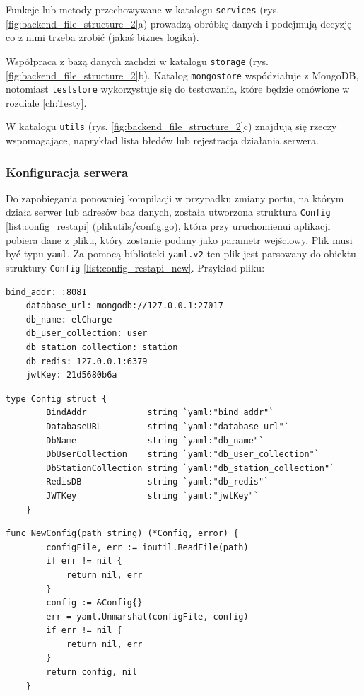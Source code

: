 Funkcje lub metody przechowywane w katalogu \texttt{services} (rys. \ref{fig:backend_file_structure_2}a) prowadzą obróbkę danych i podejmują decyzję co z nimi trzeba zrobić (jakaś biznes logika).

Współpraca z bazą danych zachdzi w katalogu \texttt{storage} (rys. \ref{fig:backend_file_structure_2}b). Katalog \texttt{mongostore} wspódziałuje z MongoDB, notomiast \texttt{teststore} wykorzystuje się do testowania, które będzie omówione w rozdiale \ref{ch:Testy}.

W katalogu \texttt{utils} (rys. \ref{fig:backend_file_structure_2}c) znajdują się rzeczy wspomagające, naprykład lista błedów lub rejestracja działania serwera.


\subsubsection{Konfiguracja serwera}
Do zapobiegania ponowniej kompilacji w przypadku zmiany portu, na którym działa serwer lub adresów baz danych, została utworzona struktura \texttt{Config} \ref{list:config_restapi} (plikutils/config.go), która przy uruchomienui aplikacji pobiera dane z pliku, który zostanie podany jako parametr wejściowy.
Plik musi być typu \texttt{yaml}. Za pomocą biblioteki \texttt{yaml.v2} ten plik jest parsowany do obiektu struktury \texttt{Config} \ref{list:config_restapi_new}. Przykład pliku:
\begin{lstlisting}[basicstyle=\tiny\ttfamily]
    bind_addr: :8081
    database_url: mongodb://127.0.0.1:27017
    db_name: elCharge
    db_user_collection: user
    db_station_collection: station
    db_redis: 127.0.0.1:6379
    jwtKey: 21d5680b6a
\end{lstlisting}

\begin{lstlisting}[label=list:config_restapi,caption=Klasa konfiguracyjna części serwerowej,basicstyle=\tiny\ttfamily]
    type Config struct {
        BindAddr            string `yaml:"bind_addr"`
        DatabaseURL         string `yaml:"database_url"`
        DbName              string `yaml:"db_name"`
        DbUserCollection    string `yaml:"db_user_collection"`
        DbStationCollection string `yaml:"db_station_collection"`
        RedisDB             string `yaml:"db_redis"`
        JWTKey              string `yaml:"jwtKey"`
    }
\end{lstlisting}

\begin{lstlisting}[label=list:config_restapi_new,caption=Wczytanie pliku konfiguracyjnego części serwerowej,basicstyle=\tiny\ttfamily]
    func NewConfig(path string) (*Config, error) {
        configFile, err := ioutil.ReadFile(path)
        if err != nil {
            return nil, err
        }
        config := &Config{}
        err = yaml.Unmarshal(configFile, config)
        if err != nil {
            return nil, err
        }
        return config, nil
    }
\end{lstlisting}
% 
